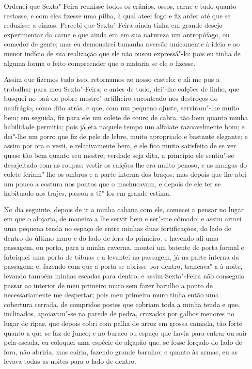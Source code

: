 Ordenei que Sexta"-Feira reunisse todos os crânios, ossos, carne e tudo
quanto restasse, e com eles fizesse uma pilha, à qual ateei fogo e fiz
arder até que se reduzisse a cinzas. Percebi que Sexta"-Feira ainda tinha
em grande desejo experimentar da carne e que ainda era em sua natureza
um antropófago, ou comedor de gente; mas eu demonstrei tamanha aversão
unicamente à ideia e ao menor indício de sua realização que ele não
ousou expressá"-lo: pois eu tinha de alguma forma o feito compreender que
o mataria se ele o fizesse.

Assim que fizemos tudo isso, retornamos ao nosso castelo; e ali me pus a
trabalhar para meu Sexta"-Feira; e antes de tudo, dei"-lhe calções de
linho, que busquei no baú do pobre mestre"-artilheiro encontrado nos
destroços do naufrágio, como dito atrás, e que, com um pequeno ajuste,
serviram"-lhe muito bem; em seguida, fiz para ele um colete de couro de
cabra, tão bem quanto minha habilidade permitia; pois já era naquele
tempo um alfaiate razoavelmente bom; e dei"-lhe um gorro que fiz de pele
de lebre, muito apropriado e bastante elegante; e assim por ora o vesti,
e relativamente bem, e ele fico muito satisfeito de se ver quase tão bem
quanto seu mestre; verdade seja dita, a princípio ele sentiu"-se
desajeitado com as roupas: vestir os calções lhe era muito penoso, e as
mangas do colete feriam"-lhe os ombros e a parte interna dos braços; mas
depois que lhe abri um pouco a costura nos pontos que o machucavam, e
depois de ele ter se habituado aos trajes, passou a tê"-los em grande
estima.

No dia seguinte, depois de ir a minha cabana com ele, comecei a pensar
no lugar em que o alojaria, de maneira a lhe servir bem e ser"-me cômodo;
e assim armei uma pequena tenda no espaço de entre minhas duas
fortificações, do lado de dentro do último muro e do lado de fora do
primeiro; e havendo ali uma passagem, ou porta, para a minha caverna,
montei um batente de porta formal e fabriquei uma porta de tábuas e a
levantei na passagem, já na parte interna da passagem; e, fazendo com
que a porta se abrisse por dentro, trancava"-a à noite, levando também
minhas escadas para dentro; e assim Sexta"-Feira não conseguia passar ao
interior de meu primeiro muro sem fazer barulho a ponto de
necessariamente me despertar; pois meu primeiro muro tinha então uma
cobertura cerrada, de compridos postes que cobriam toda a minha tenda e
que, inclinados, apoiavam"-se na parede de pedra, cruzados por galhos
menores no lugar de ripas, que depois cobri com palha de arroz em grossa
camada, tão forte quanto a que se faz de junco; e no buraco ou espaço
que havia para entrar ou sair pela escada, eu coloquei uma espécie de
alçapão que, se fosse forçado do lado de fora, não abriria, mas cairia,
fazendo grande barulho; e quanto às armas, eu as levava todas as noites
para o lado de dentro.

